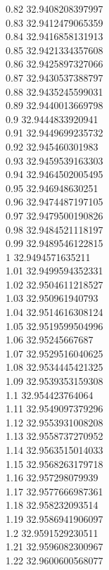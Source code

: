 {0.82	32.9408208397997\\
0.83	32.9412479065359\\
0.84	32.9416858131913\\
0.85	32.9421334357608\\
0.86	32.9425897327066\\
0.87	32.9430537388797\\
0.88	32.9435245599031\\
0.89	32.9440013669798\\
0.9	32.9444833920941\\
0.91	32.9449699235732\\
0.92	32.945460301983\\
0.93	32.9459539163303\\
0.94	32.9464502005495\\
0.95	32.946948630251\\
0.96	32.9474487197105\\
0.97	32.9479500190826\\
0.98	32.9484521118197\\
0.99	32.9489546122815\\
1	32.9494571635211\\
1.01	32.9499594352331\\
1.02	32.9504611218527\\
1.03	32.950961940793\\
1.04	32.9514616308124\\
1.05	32.9519599504996\\
1.06	32.95245667687\\
1.07	32.9529516040625\\
1.08	32.9534445421325\\
1.09	32.9539353159308\\
1.1	32.954423764064\\
1.11	32.9549097379296\\
1.12	32.9553931008208\\
1.13	32.9558737270952\\
1.14	32.9563515014033\\
1.15	32.9568263179718\\
1.16	32.957298079939\\
1.17	32.9577666987361\\
1.18	32.958232093514\\
1.19	32.9586941906097\\
1.2	32.9591529230511\\
1.21	32.9596082300967\\
1.22	32.9600600568077\\
}
